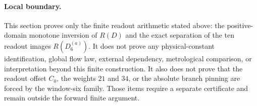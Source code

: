 \paragraph{Local boundary.}
This section proves only the finite readout arithmetic stated above: the positive-domain monotone inversion of $R(D)$ and the exact separation of the ten readout images $R(D_6^{(a)})$.  It does not prove any physical-constant identification, global flow law, external dependency, metrological comparison, or interpretation beyond this finite construction.  It also does not prove that the readout offset $C_0$, the weights $21$ and $34$, or the absolute branch pinning are forced by the window-six family.  Those items require a separate certificate and remain outside the forward finite argument.
